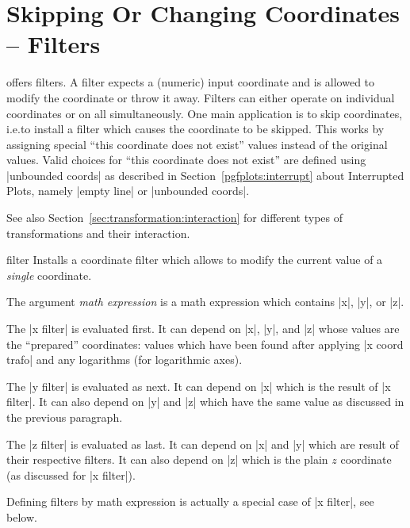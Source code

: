 
\section{Skipping Or Changing Coordinates -- Filters}
\label{sec:filters}

\PGFPlots{} offers filters. A filter expects a (numeric) input coordinate and
is allowed to modify the coordinate or throw it away. Filters can either
operate on individual coordinates or on all simultaneously. One main
application is to skip coordinates, i.e.\@ to install a filter which causes the
coordinate to be skipped. This works by assigning special ``this coordinate
does not exist'' values instead of the original values. Valid choices for
``this coordinate does not exist'' are defined using |unbounded coords| as
described in Section~\ref{pgfplots:interrupt} about Interrupted Plots, namely
|empty line| or |unbounded coords|.

See also Section~\ref{sec:transformation:interaction} for different types of
transformations and their interaction.

\begin{pgfplotsxyexpressionkeylist}{\x\space filter}
    Installs a coordinate filter which allows to modify the current value of a
    \emph{single} coordinate.

    The argument \emph{math expression} is a math expression which contains
    |x|, |y|, or |z|.
\begin{codeexample}[]
\end{codeexample}

    The |x filter| is evaluated first. It can depend on |x|, |y|, and |z| whose
    values are the ``prepared'' coordinates: values which have been found after
    applying |x coord trafo| and any logarithms (for logarithmic axes).

    The |y filter| is evaluated as next. It can depend on |x| which is the
    result of |x filter|. It can also depend on |y| and |z| which have the same
    value as discussed in the previous paragraph.

    The |z filter| is evaluated as last. It can depend on |x| and |y| which are
    result of their respective filters. It can also depend on |z| which is the
    plain $z$ coordinate (as discussed for |x filter|).

    Defining filters by math expression is actually a special case of
    |x filter|, see below.
\end{pgfplotsxyexpressionkeylist}

